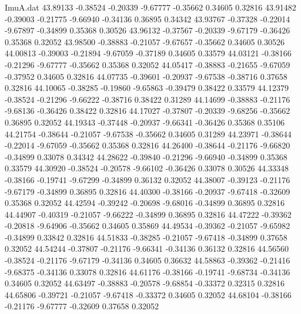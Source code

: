 \begin{filecontents}{ImuA.dat}
  43.89133   -0.38524   -0.20339   -9.67777   -0.35662    0.34605    0.32816
  43.91482   -0.39003   -0.21775   -9.66940   -0.34136    0.36895    0.34342
  43.93767   -0.37328   -0.22014   -9.67897   -0.34899    0.35368    0.30526
  43.96132   -0.37567   -0.20339   -9.67179   -0.36426    0.35368    0.32052
  43.98500   -0.38883   -0.21057   -9.67657   -0.35662    0.34605    0.30526
  44.00813   -0.39003   -0.21894   -9.67059   -0.37189    0.34605    0.33579
  44.03121   -0.38166   -0.21296   -9.67777   -0.35662    0.35368    0.32052
  44.05417   -0.38883   -0.21655   -9.67059   -0.37952    0.34605    0.32816
  44.07735   -0.39601   -0.20937   -9.67538   -0.38716    0.37658    0.32816
  44.10065   -0.38285   -0.19860   -9.65863   -0.39479    0.38422    0.33579
  44.12379   -0.38524   -0.21296   -9.66222   -0.38716    0.38422    0.31289
  44.14699   -0.38883   -0.21176   -9.68136   -0.36426    0.38422    0.32816
  44.17027   -0.37807   -0.20339   -9.68256   -0.35662    0.36895    0.32052
  44.19343   -0.37448   -0.20937   -9.66341   -0.36426    0.35368    0.35106
  44.21754   -0.38644   -0.21057   -9.67538   -0.35662    0.34605    0.31289
  44.23971   -0.38644   -0.22014   -9.67059   -0.35662    0.35368    0.32816
  44.26400   -0.38644   -0.21176   -9.66820   -0.34899    0.33078    0.34342
  44.28622   -0.39840   -0.21296   -9.66940   -0.34899    0.35368    0.33579
  44.30920   -0.38524   -0.20578   -9.66102   -0.36426    0.33078    0.30526
  44.33348   -0.38166   -0.19741   -9.67299   -0.34899    0.36132    0.32052
  44.38007   -0.39123   -0.21176   -9.67179   -0.34899    0.36895    0.32816
  44.40300   -0.38166   -0.20937   -9.67418   -0.32609    0.35368    0.32052
  44.42594   -0.39242   -0.20698   -9.68016   -0.34899    0.36895    0.32816
  44.44907   -0.40319   -0.21057   -9.66222   -0.34899    0.36895    0.32816
  44.47222   -0.39362   -0.20818   -9.64906   -0.35662    0.34605    0.35869
  44.49534   -0.39362   -0.21057   -9.65982   -0.34899    0.33842    0.32816
  44.51833   -0.38285   -0.21057   -9.67418   -0.34899    0.37658    0.32052
  44.54244   -0.37807   -0.21176   -9.66341   -0.34136    0.36132    0.32816
  44.56560   -0.38524   -0.21176   -9.67179   -0.34136    0.34605    0.36632
  44.58863   -0.39362   -0.21416   -9.68375   -0.34136    0.33078    0.32816
  44.61176   -0.38166   -0.19741   -9.68734   -0.34136    0.34605    0.32052
  44.63497   -0.38883   -0.20578   -9.68854   -0.33372    0.32315    0.32816
  44.65806   -0.39721   -0.21057   -9.67418   -0.33372    0.34605    0.32052
  44.68104   -0.38166   -0.21176   -9.67777   -0.32609    0.37658    0.32052

\end{filecontents}
